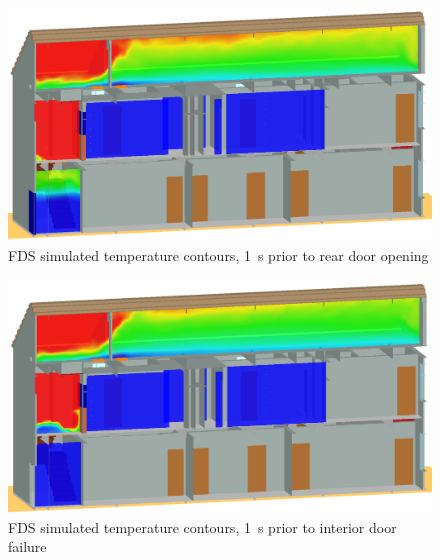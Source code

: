 \begin{figure}[!ht]
\includegraphics[width=.675\textwidth]{../Figures/west_50th_baseline_129}
 

\caption{FDS simulated temperature contours, 1~s prior to rear door opening}
\label{fig:temp_129s}
\end{figure}

\begin{figure}[!ht]
\includegraphics[width=.675\textwidth]{../Figures/west_50th_baseline_159}
 

\caption{FDS simulated temperature contours, 1~s prior to interior door failure}
\label{fig:temp_159s}
\end{figure}

